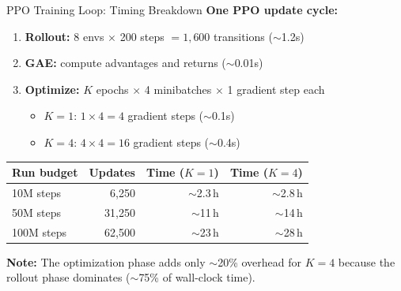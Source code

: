 \documentclass[aspectratio=169,11pt]{beamer}
\begin{document}
\begin{frame}{PPO Training Loop: Timing Breakdown}
  \small
  \textbf{One PPO update cycle:}
  \begin{enumerate}\setlength\itemsep{4pt}
    \item \textbf{Rollout:} 8 envs $\times$ 200 steps $= 1{,}600$ transitions ($\sim$1.2s)
    \item \textbf{GAE:} compute advantages and returns ($\sim$0.01s)
    \item \textbf{Optimize:} $K$ epochs $\times$ 4 minibatches $\times$ 1 gradient step each
      \begin{itemize}\setlength\itemsep{1pt}
        \item $K{=}1$: $1 \times 4 = 4$ gradient steps ($\sim$0.1s)
        \item $K{=}4$: $4 \times 4 = 16$ gradient steps ($\sim$0.4s)
      \end{itemize}
  \end{enumerate}

  \medskip
  \begin{center}
  \begin{tabular}{lrrr}
    \toprule
    \textbf{Run budget} & \textbf{Updates} & \textbf{Time ($K{=}1$)} & \textbf{Time ($K{=}4$)} \\
    \midrule
    10M steps  &  6{,}250 & $\sim$2.3\,h & $\sim$2.8\,h \\
    50M steps  & 31{,}250 & $\sim$11\,h  & $\sim$14\,h  \\
    100M steps & 62{,}500 & $\sim$23\,h  & $\sim$28\,h  \\
    \bottomrule
  \end{tabular}
  \end{center}

  \smallskip
  \textbf{Note:} The optimization phase adds only $\sim$20\% overhead for $K{=}4$
  because the rollout phase dominates ($\sim$75\% of wall-clock time).
\end{frame}
\end{document}
